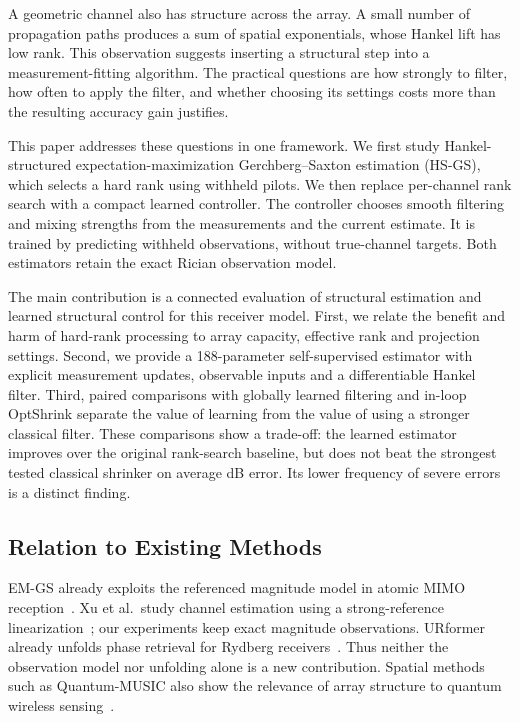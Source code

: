 \documentclass[10pt,journal,letterpaper]{IEEEtran}
\begin{document}
A geometric channel also has structure across the array. A small number of propagation paths produces a sum of spatial exponentials, whose Hankel lift has low rank. This observation suggests inserting a structural step into a measurement-fitting algorithm. The practical questions are how strongly to filter, how often to apply the filter, and whether choosing its settings costs more than the resulting accuracy gain justifies.

This paper addresses these questions in one framework. We first study Hankel-structured expectation-maximization Gerchberg--Saxton estimation (HS-GS), which selects a hard rank using withheld pilots. We then replace per-channel rank search with a compact learned controller. The controller chooses smooth filtering and mixing strengths from the measurements and the current estimate. It is trained by predicting withheld observations, without true-channel targets. Both estimators retain the exact Rician observation model.

The main contribution is a connected evaluation of structural estimation and learned structural control for this receiver model. First, we relate the benefit and harm of hard-rank processing to array capacity, effective rank and projection settings. Second, we provide a 188-parameter self-supervised estimator with explicit measurement updates, observable inputs and a differentiable Hankel filter. Third, paired comparisons with globally learned filtering and in-loop OptShrink separate the value of learning from the value of using a stronger classical filter. These comparisons show a trade-off: the learned estimator improves over the original rank-search baseline, but does not beat the strongest tested classical shrinker on average dB error. Its lower frequency of severe errors is a distinct finding.

\subsection{Relation to Existing Methods}
EM-GS already exploits the referenced magnitude model in atomic MIMO reception~\cite{cui2025}. Xu et al.\ study channel estimation using a strong-reference linearization~\cite{xu2025}; our experiments keep exact magnitude observations. URformer already unfolds phase retrieval for Rydberg receivers~\cite{xiao2026}. Thus neither the observation model nor unfolding alone is a new contribution. Spatial methods such as Quantum-MUSIC also show the relevance of array structure to quantum wireless sensing~\cite{kim2025quantummusic}.
\end{document}
